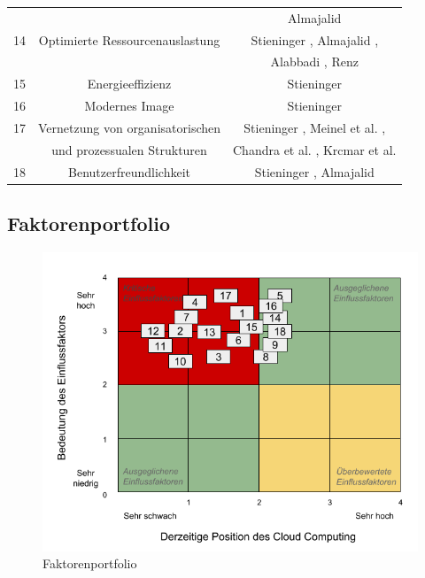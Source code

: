\begin{table}[!htb]
\begin{center}
{\begin{tabular}{c c c }
				&& Almajalid \cite{almajalid} \\
				14 & Optimierte Ressourcenauslastung & Stieninger \cite{stieninger}, Almajalid \cite{almajalid}, \\
				&& Alabbadi \cite{alabbadi}, Renz \cite{renz} \\
				15 & Energieeffizienz & Stieninger \cite{stieninger} \\
				16 & Modernes Image & Stieninger \cite{stieninger} \\
				17 & Vernetzung von organisatorischen & Stieninger \cite{stieninger}, Meinel et al. \cite{meinel}, \\
				& und prozessualen Strukturen & Chandra et al. \cite{chandra}, Krcmar et al. \cite{krcmar} \\
				18 & Benutzerfreundlichkeit & Stieninger \cite{stieninger}, Almajalid \cite{almajalid} \\
				\hline
			\end{tabular}
		}
		\label{tab:factors1}
	\end{center}
\end{table}
\FloatBarrier

\subsection{Faktorenportfolio}

\begin{figure}
	\centering
	\includegraphics[width=\linewidth]{images/portfolio}
	\caption[Caption for parameters]{Faktorenportfolio}
	\label{fig:portfolio}
\end{figure}

